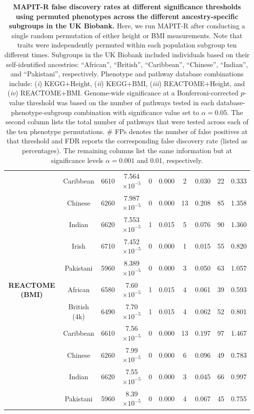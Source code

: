 \documentclass[10pt]{article}
\begin{document}
\begin{landscape}
\begin{table}[ht]
\begin{tabular}{|c|c|c|ccc|cc|cc|}
 & Caribbean & 6610 & 7.564$\times10^{-5}$ & 0 & 0.000 & 2 & 0.030 & 22 & 0.333 \\ 
 & Chinese & 6260 & 7.987$\times10^{-5}$ & 0 & 0.000 & 13 & 0.208 & 85 & 1.358 \\ 
 & Indian & 6620 & 7.553$\times10^{-5}$ & 1 & 0.015 & 5 & 0.076 & 90 & 1.360 \\ 
 & Irish & 6710 & 7.452$\times10^{-5}$ & 0 & 0.000 & 1 & 0.015 & 55 & 0.820 \\
 & Pakistani & 5960 & 8.389$\times10^{-5}$ & 0 & 0.000 & 3 & 0.050 & 63 & 1.057 \\
\hline 
\multirow{6.5}{*}{\textbf{REACTOME (BMI)}} & African & 6580 & 7.60$\times10^{-5}$ & 1 & 0.015 & 4 & 0.061 & 39 & 0.593 \\
 & British (4k) & 6490 & 7.70$\times10^{-5}$ & 1 & 0.015 & 4 & 0.062 & 52 & 0.801 \\
 & Caribbean & 6610 & 7.56$\times10^{-5}$ & 0 & 0.000 & 13 & 0.197 & 97 & 1.467 \\
 & Chinese & 6260 & 7.99$\times10^{-5}$ & 0 & 0.000 & 6 & 0.096 & 49 & 0.783 \\
 & Indian & 6620 & 7.55$\times10^{-5}$ & 0 & 0.000 & 3 & 0.045 & 66 & 0.997 \\
 & Pakistani & 5960 & 8.39$\times10^{-5}$ & 0 & 0.000 & 4 & 0.067 & 45 & 0.755 \\
   \hline
\end{tabular}
\caption[TBD]{\textbf{MAPIT-R false discovery rates at different significance thresholds using permuted phenotypes across the different ancestry-specific subgroups in the UK Biobank.} Here, we run MAPIT-R after conducting a single random permutation of either height or BMI measurements. Note that traits were independently permuted within each population subgroup ten different times. Subgroups in the UK Biobank included individuals based on their self-identified ancestries: ``African'', ``British'', ``Caribbean'', ``Chinese'', ``Indian'', and ``Pakistani'', respectively. Phenotype and pathway database combinations include: (\textit{i}) KEGG+Height, (\textit{ii}) KEGG+BMI, (\textit{iii}) REACTOME+Height, and (\textit{iv}) REACTOME+BMI. Genome-wide significance at a Bonferroni-corrected $p$-value threshold was based on the number of pathways tested in each database-phenotype-subgroup combination with significance value set to $\alpha = 0.05$. The second column lists the total number of pathways that were tested across each of the ten phenotype permutations. \# FPs denotes the number of false positives at that threshold and FDR reports the corresponding false discovery rate (listed as percentages). The remaining columns list the same information but at significance levels $\alpha = 0.001$ and 0.01, respectively.}
\label{InterPath-Supp-Table-AllPops-FDRs}
\end{table}

\end{landscape}
\clearpage
\end{document}

